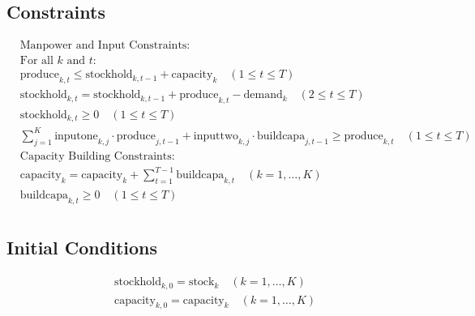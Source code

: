 \documentclass{article}
\begin{document}
\subsection*{Constraints}
\begin{align}
    &\text{Manpower and Input Constraints:} \\
    &\text{For all } k \text{ and } t: \\
    &\text{produce}_{k,t} \leq \text{stockhold}_{k,t-1} + \text{capacity}_{k} \quad (1 \leq t \leq T) \\
    &\text{stockhold}_{k,t} = \text{stockhold}_{k,t-1} + \text{produce}_{k,t} - \text{demand}_{k} \quad (2 \leq t \leq T) \\
    &\text{stockhold}_{k,t} \geq 0 \quad (1 \leq t \leq T) \\
    &\sum_{j=1}^{K} \text{inputone}_{k,j} \cdot \text{produce}_{j,t-1} + \text{inputtwo}_{k,j} \cdot \text{buildcapa}_{j,t-1} \geq \text{produce}_{k,t} \quad (1 \leq t \leq T) \\

    &\text{Capacity Building Constraints:} \\
    &\text{capacity}_{k} = \text{capacity}_{k} + \sum_{t=1}^{T-1} \text{buildcapa}_{k,t} \quad (k=1,\ldots,K) \\
    &\text{buildcapa}_{k,t} \geq 0 \quad (1 \leq t \leq T) \\
\end{align}

\subsection*{Initial Conditions}
\begin{align}
    &\text{stockhold}_{k,0} = \text{stock}_{k} \quad (k=1,\ldots,K) \\
    &\text{capacity}_{k,0} = \text{capacity}_{k} \quad (k=1,\ldots,K) \\
\end{align}
\end{document}
